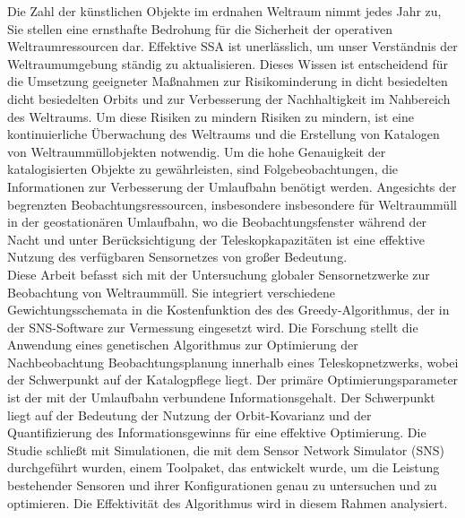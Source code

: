 Die Zahl der künstlichen Objekte im erdnahen Weltraum nimmt jedes Jahr zu,
Sie stellen eine ernsthafte Bedrohung für die Sicherheit der operativen Weltraumressourcen dar. Effektive SSA ist unerlässlich, um unser Verständnis der Weltraumumgebung ständig zu aktualisieren.
Dieses Wissen ist entscheidend für die Umsetzung geeigneter Maßnahmen zur Risikominderung in dicht besiedelten
dicht besiedelten Orbits und zur Verbesserung der Nachhaltigkeit im Nahbereich des Weltraums. Um diese Risiken zu mindern
Risiken zu mindern, ist eine kontinuierliche Überwachung des Weltraums und die Erstellung von Katalogen von Weltraummüllobjekten
notwendig. Um die hohe Genauigkeit der katalogisierten Objekte zu gewährleisten, sind Folgebeobachtungen, die
Informationen zur Verbesserung der Umlaufbahn benötigt werden. Angesichts der begrenzten Beobachtungsressourcen, insbesondere
insbesondere für Weltraummüll in der geostationären Umlaufbahn, wo die Beobachtungsfenster während der Nacht
und unter Berücksichtigung der Teleskopkapazitäten ist eine effektive Nutzung des verfügbaren Sensornetzes
von großer Bedeutung.\\

Diese Arbeit befasst sich mit der Untersuchung globaler Sensornetzwerke zur Beobachtung von Weltraummüll. Sie integriert verschiedene Gewichtungsschemata in die Kostenfunktion des 
des Greedy-Algorithmus, der in der SNS-Software zur Vermessung eingesetzt wird. Die Forschung stellt die Anwendung eines genetischen Algorithmus zur Optimierung der Nachbeobachtung 
Beobachtungsplanung innerhalb eines Teleskopnetzwerks, wobei der Schwerpunkt auf der Katalogpflege liegt. Der primäre Optimierungsparameter ist der mit der Umlaufbahn verbundene Informationsgehalt. 
Der Schwerpunkt liegt auf der Bedeutung der Nutzung der Orbit-Kovarianz und der Quantifizierung des Informationsgewinns für eine effektive Optimierung.
Die Studie schließt mit Simulationen, die mit dem Sensor Network Simulator (SNS) durchgeführt wurden, einem Toolpaket, das entwickelt wurde, um die Leistung bestehender Sensoren und ihrer Konfigurationen genau zu untersuchen und zu optimieren. Die Effektivität des Algorithmus wird in diesem Rahmen analysiert.